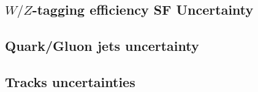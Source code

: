 \subsection{$W/Z$-tagging efficiency SF Uncertainty}


\subsection{Quark/Gluon jets uncertainty}


\subsection{Tracks uncertainties}



